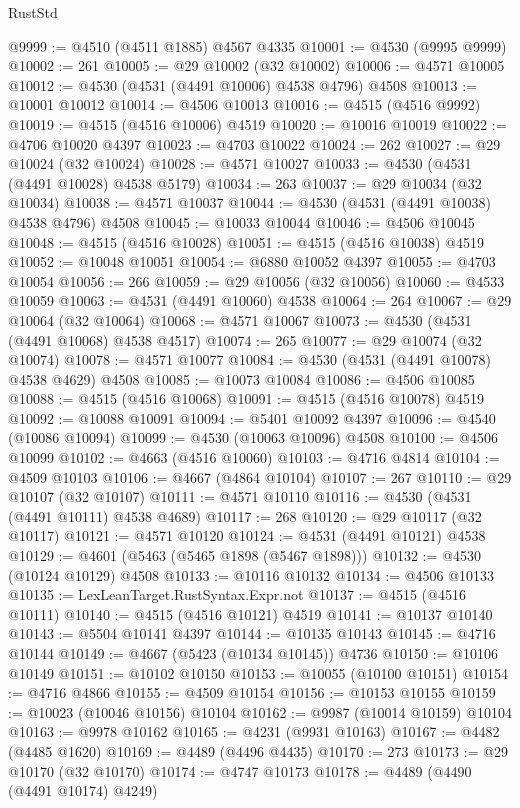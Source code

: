 \begin{lexlean}{RustStd}
\begin{coremodule}
@9999 := @4510 (@4511 @1885) @4567 @4335
@10001 := @4530 (@9995 @9999)
@10002 := 261
@10005 := @29 @10002 (@32 @10002)
@10006 := @4571 @10005
@10012 := @4530 (@4531 (@4491 @10006) @4538 @4796) @4508
@10013 := @10001 @10012
@10014 := @4506 @10013
@10016 := @4515 (@4516 @9992)
@10019 := @4515 (@4516 @10006) @4519
@10020 := @10016 @10019
@10022 := @4706 @10020 @4397
@10023 := @4703 @10022
@10024 := 262
@10027 := @29 @10024 (@32 @10024)
@10028 := @4571 @10027
@10033 := @4530 (@4531 (@4491 @10028) @4538 @5179)
@10034 := 263
@10037 := @29 @10034 (@32 @10034)
@10038 := @4571 @10037
@10044 := @4530 (@4531 (@4491 @10038) @4538 @4796) @4508
@10045 := @10033 @10044
@10046 := @4506 @10045
@10048 := @4515 (@4516 @10028)
@10051 := @4515 (@4516 @10038) @4519
@10052 := @10048 @10051
@10054 := @6880 @10052 @4397
@10055 := @4703 @10054
@10056 := 266
@10059 := @29 @10056 (@32 @10056)
@10060 := @4533 @10059
@10063 := @4531 (@4491 @10060) @4538
@10064 := 264
@10067 := @29 @10064 (@32 @10064)
@10068 := @4571 @10067
@10073 := @4530 (@4531 (@4491 @10068) @4538 @4517)
@10074 := 265
@10077 := @29 @10074 (@32 @10074)
@10078 := @4571 @10077
@10084 := @4530 (@4531 (@4491 @10078) @4538 @4629) @4508
@10085 := @10073 @10084
@10086 := @4506 @10085
@10088 := @4515 (@4516 @10068)
@10091 := @4515 (@4516 @10078) @4519
@10092 := @10088 @10091
@10094 := @5401 @10092 @4397
@10096 := @4540 (@10086 @10094)
@10099 := @4530 (@10063 @10096) @4508
@10100 := @4506 @10099
@10102 := @4663 (@4516 @10060)
@10103 := @4716 @4814
@10104 := @4509 @10103
@10106 := @4667 (@4864 @10104)
@10107 := 267
@10110 := @29 @10107 (@32 @10107)
@10111 := @4571 @10110
@10116 := @4530 (@4531 (@4491 @10111) @4538 @4689)
@10117 := 268
@10120 := @29 @10117 (@32 @10117)
@10121 := @4571 @10120
@10124 := @4531 (@4491 @10121) @4538
@10129 := @4601 (@5463 (@5465 @1898 (@5467 @1898)))
@10132 := @4530 (@10124 @10129) @4508
@10133 := @10116 @10132
@10134 := @4506 @10133
@10135 := LexLeanTarget.RustSyntax.Expr.not
@10137 := @4515 (@4516 @10111)
@10140 := @4515 (@4516 @10121) @4519
@10141 := @10137 @10140
@10143 := @5504 @10141 @4397
@10144 := @10135 @10143
@10145 := @4716 @10144
@10149 := @4667 (@5423 (@10134 @10145)) @4736
@10150 := @10106 @10149
@10151 := @10102 @10150
@10153 := @10055 (@10100 @10151)
@10154 := @4716 @4866
@10155 := @4509 @10154
@10156 := @10153 @10155
@10159 := @10023 (@10046 @10156) @10104
@10162 := @9987 (@10014 @10159) @10104
@10163 := @9978 @10162
@10165 := @4231 (@9931 @10163)
@10167 := @4482 (@4485 @1620)
@10169 := @4489 (@4496 @4435)
@10170 := 273
@10173 := @29 @10170 (@32 @10170)
@10174 := @4747 @10173
@10178 := @4489 (@4490 (@4491 @10174) @4249)

\end{coremodule}
\end{lexlean}
